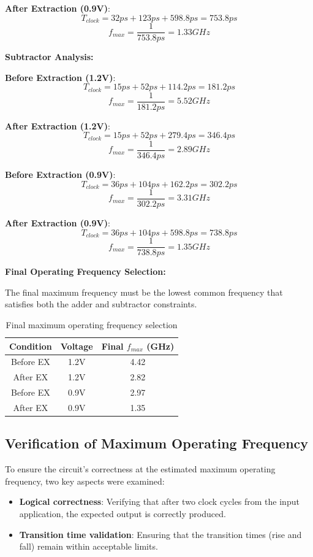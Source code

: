 \documentclass[a4paper,12pt]{article}
\begin{document}
\textbf{After Extraction (0.9V)}:
\[
T_{clock} = 32ps + 123ps + 598.8ps = 753.8ps
\]
\[
f_{max} = \frac{1}{753.8ps} = 1.33GHz
\]

\textbf{Subtractor Analysis:}

\textbf{Before Extraction (1.2V)}:
\[
T_{clock} = 15ps + 52ps + 114.2ps = 181.2ps
\]
\[
f_{max} = \frac{1}{181.2ps} = 5.52GHz
\]

\textbf{After Extraction (1.2V)}:
\[
T_{clock} = 15ps + 52ps + 279.4ps = 346.4ps
\]
\[
f_{max} = \frac{1}{346.4ps} = 2.89GHz
\]

\textbf{Before Extraction (0.9V)}:
\[
T_{clock} = 36ps + 104ps + 162.2ps = 302.2ps
\]
\[
f_{max} = \frac{1}{302.2ps} = 3.31GHz
\]

\textbf{After Extraction (0.9V)}:
\[
T_{clock} = 36ps + 104ps + 598.8ps = 738.8ps
\]
\[
f_{max} = \frac{1}{738.8ps} = 1.35GHz
\]

\textbf{Final Operating Frequency Selection:}

The final maximum frequency must be the lowest common frequency that satisfies both the adder and subtractor constraints.

\begin{table}[H]
    \centering
    \begin{tabular}{|c|c|c|}
        \hline
        Condition & Voltage & Final \( f_{max} \) (GHz) \\
        \hline
        Before EX & 1.2V & 4.42 \\
        After EX & 1.2V & 2.82 \\
        Before EX & 0.9V & 2.97 \\
        After EX & 0.9V & 1.35 \\
        \hline
    \end{tabular}
    \caption{Final maximum operating frequency selection}
\end{table}


\subsection{Verification of Maximum Operating Frequency}

To ensure the circuit's correctness at the estimated maximum operating frequency, two key aspects were examined: 
\begin{itemize}
    \item \textbf{Logical correctness}: Verifying that after two clock cycles from the input application, the expected output is correctly produced.
    \item \textbf{Transition time validation}: Ensuring that the transition times (rise and fall) remain within acceptable limits.
\end{itemize}
\end{document}
